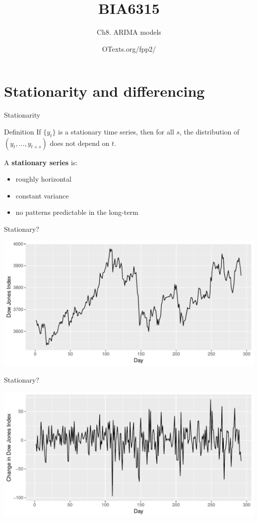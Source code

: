 \documentclass[14pt,ignorenonframetext,]{beamer}
\title{BIA6315}
\author{Ch8. ARIMA models}
\date{OTexts.org/fpp2/}
\providecommand{\tightlist}{%
  \setlength{\itemsep}{0pt}\setlength{\parskip}{0pt}}
\begin{document}
\frame{\titlepage}

\section{Stationarity and
differencing}\label{stationarity-and-differencing}

\begin{frame}{Stationarity}

\begin{block}{Definition}
If $\{y_t\}$ is a stationary time series, then for all $s$, the distribution of $(y_t,\dots,y_{t+s})$ does not depend on $t$.
\end{block}

\pause

A \textbf{stationary series} is:

\begin{itemize}
\tightlist
\item
  roughly horizontal
\item
  constant variance
\item
  no patterns predictable in the long-term
\end{itemize}

\end{frame}

\begin{frame}{Stationary?}

\includegraphics{week_5_arima_files/figure-beamer/unnamed-chunk-1-1.pdf}

\end{frame}

\begin{frame}{Stationary?}

\includegraphics{week_5_arima_files/figure-beamer/unnamed-chunk-2-1.pdf}

\end{frame}
\end{document}
